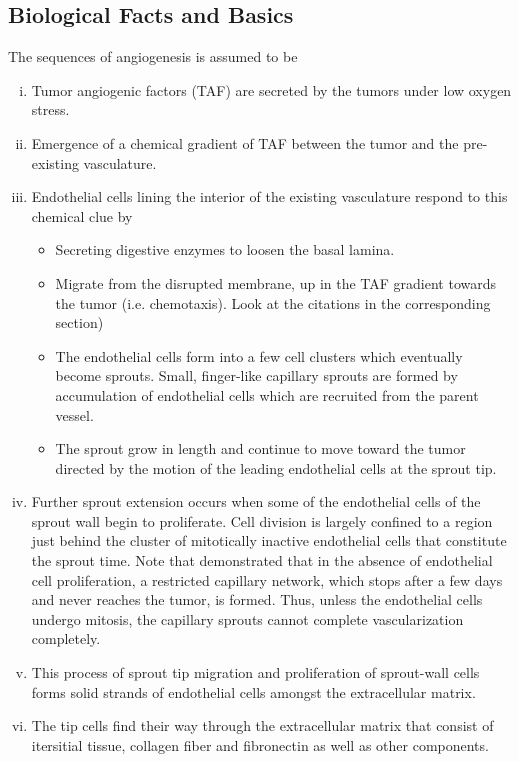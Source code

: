 \subsection{Biological Facts and Basics}
\label{subsection:AndersonChaplainBiologyFacts}
The sequences of angiogenesis is assumed to be
\begin{enumerate}[(i),noitemsep]
	\item Tumor angiogenic factors (TAF) are secreted by the tumors under low oxygen stress. 
	\item Emergence of a chemical gradient of TAF between the tumor and the pre-existing vasculature.
	\item Endothelial cells lining the interior of the existing vasculature respond to this chemical clue by
	\begin{itemize}[noitemsep]
		\item Secreting digestive enzymes to loosen the basal lamina.
		\item Migrate from the disrupted membrane, up in the TAF gradient towards the tumor (i.e. chemotaxis). Look at the citations in the corresponding section)
		\item \label{item:InitialDistributionOfTipCells} The endothelial cells form into a few cell clusters \cite{Muthukkaruppan1982,Orme1996} which eventually become sprouts. Small, finger-like capillary sprouts are formed by accumulation of endothelial cells which are recruited from the parent vessel.
		\item The sprout grow in length and continue to move toward the tumor directed by the motion of the leading endothelial cells at the sprout tip.
	\end{itemize} 
	\item Further sprout extension occurs when some of the endothelial cells of the sprout wall begin to proliferate. Cell division is largely confined to a region just behind the cluster of mitotically inactive endothelial cells that constitute the sprout time. Note that \cite{Sholley1984} demonstrated that in the absence of endothelial cell proliferation, a restricted capillary network, which stops after a few days and never reaches the tumor, is formed. Thus, unless the endothelial cells undergo mitosis, the capillary sprouts cannot complete vascularization completely. \label{item:tipCeillsAreDividing}
	\item This process of sprout tip migration and proliferation of sprout-wall cells forms solid strands of endothelial cells amongst the extracellular matrix.
	\item The tip cells find their way through the extracellular matrix that consist of itersitial tissue, collagen fiber and fibronectin as well as other components.

\end{enumerate}
